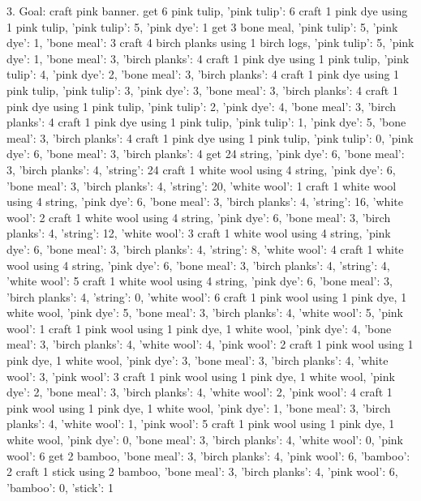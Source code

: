 \begin{UserTurn}
3.
Goal: craft pink banner.
get 6 pink tulip, {'pink tulip': 6}
craft 1 pink dye using 1 pink tulip, {'pink tulip': 5, 'pink dye': 1}
get 3 bone meal, {'pink tulip': 5, 'pink dye': 1, 'bone meal': 3}
craft 4 birch planks using 1 birch logs, {'pink tulip': 5, 'pink dye': 1, 'bone meal': 3, 'birch planks': 4}
craft 1 pink dye using 1 pink tulip, {'pink tulip': 4, 'pink dye': 2, 'bone meal': 3, 'birch planks': 4}
craft 1 pink dye using 1 pink tulip, {'pink tulip': 3, 'pink dye': 3, 'bone meal': 3, 'birch planks': 4}
craft 1 pink dye using 1 pink tulip, {'pink tulip': 2, 'pink dye': 4, 'bone meal': 3, 'birch planks': 4}
craft 1 pink dye using 1 pink tulip, {'pink tulip': 1, 'pink dye': 5, 'bone meal': 3, 'birch planks': 4}
craft 1 pink dye using 1 pink tulip, {'pink tulip': 0, 'pink dye': 6, 'bone meal': 3, 'birch planks': 4}
get 24 string, {'pink dye': 6, 'bone meal': 3, 'birch planks': 4, 'string': 24}
craft 1 white wool using 4 string, {'pink dye': 6, 'bone meal': 3, 'birch planks': 4, 'string': 20, 'white wool': 1}
craft 1 white wool using 4 string, {'pink dye': 6, 'bone meal': 3, 'birch planks': 4, 'string': 16, 'white wool': 2}
craft 1 white wool using 4 string, {'pink dye': 6, 'bone meal': 3, 'birch planks': 4, 'string': 12, 'white wool': 3}
craft 1 white wool using 4 string, {'pink dye': 6, 'bone meal': 3, 'birch planks': 4, 'string': 8, 'white wool': 4}
craft 1 white wool using 4 string, {'pink dye': 6, 'bone meal': 3, 'birch planks': 4, 'string': 4, 'white wool': 5}
craft 1 white wool using 4 string, {'pink dye': 6, 'bone meal': 3, 'birch planks': 4, 'string': 0, 'white wool': 6}
craft 1 pink wool using 1 pink dye, 1 white wool, {'pink dye': 5, 'bone meal': 3, 'birch planks': 4, 'white wool': 5, 'pink wool': 1}
craft 1 pink wool using 1 pink dye, 1 white wool, {'pink dye': 4, 'bone meal': 3, 'birch planks': 4, 'white wool': 4, 'pink wool': 2}
craft 1 pink wool using 1 pink dye, 1 white wool, {'pink dye': 3, 'bone meal': 3, 'birch planks': 4, 'white wool': 3, 'pink wool': 3}
craft 1 pink wool using 1 pink dye, 1 white wool, {'pink dye': 2, 'bone meal': 3, 'birch planks': 4, 'white wool': 2, 'pink wool': 4}
craft 1 pink wool using 1 pink dye, 1 white wool, {'pink dye': 1, 'bone meal': 3, 'birch planks': 4, 'white wool': 1, 'pink wool': 5}
craft 1 pink wool using 1 pink dye, 1 white wool, {'pink dye': 0, 'bone meal': 3, 'birch planks': 4, 'white wool': 0, 'pink wool': 6}
get 2 bamboo, {'bone meal': 3, 'birch planks': 4, 'pink wool': 6, 'bamboo': 2}
craft 1 stick using 2 bamboo, {'bone meal': 3, 'birch planks': 4, 'pink wool': 6, 'bamboo': 0, 'stick': 1}

\end{UserTurn}
